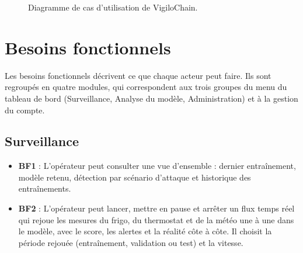 \begin{figure}[H]
\caption{Diagramme de cas d'utilisation de VigiloChain.}
\label{fig:casutilisation}
\end{figure}

\section{Besoins fonctionnels}

Les besoins fonctionnels décrivent ce que chaque acteur peut faire. Ils sont
regroupés en quatre modules, qui correspondent aux trois groupes du menu du
tableau de bord (Surveillance, Analyse du modèle, Administration) et à la
gestion du compte.

\subsection*{Surveillance}
\begin{itemize}
  \item \textbf{BF1} : L'opérateur peut consulter une vue d'ensemble : dernier
        entraînement, modèle retenu, détection par scénario d'attaque et
        historique des entraînements.
  \item \textbf{BF2} : L'opérateur peut lancer, mettre en pause et arrêter un
        flux temps réel qui rejoue les mesures du frigo, du thermostat et de la
        météo une à une dans le modèle, avec le score, les alertes et la
        réalité côte à côte. Il choisit la période rejouée (entraînement,
        validation ou test) et la vitesse.
\end{itemize}

